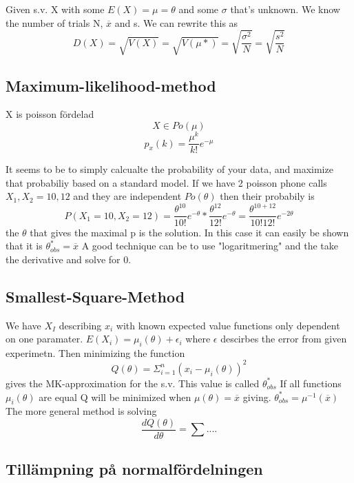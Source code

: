 \documentclass{article}
\begin{document}
        Given s.v. X with some $E(X) = \mu = \theta$ and some $\sigma$
        that's unknown. We know the number of trials N, $\overline{x}$ and s.
        We can rewrite this as
        \[
            D(X) = \sqrt{V(X)} = \sqrt{V(\mu*)} = \sqrt{\frac{\sigma^2}{N}}
            = \sqrt{\frac{s^2}{N}}
        \]
        
        
    \subsection{Maximum-likelihood-method}
        X is poisson fördelad
        \[
            X \in Po(\mu)    
        \]
        \[
            p_x(k) = \frac{\mu^k}{k!}e^{-\mu}
        \]
        
        It seems to be to simply calcualte the probability of your data, and 
        maximize that probabiliy based on a standard model. If we have 2 poisson
        phone calls $X_1, X_2= 10, 12$ and they are independent $Po(\theta)$
        then their probabily is 
        \[
            P(X_1 = 10, X_2 = 12) = \frac{\theta^{10}}{10!}e^{-\theta}*\frac{\theta^{12}}{12!}e^{-\theta} = \frac{\theta^{10+12}}{10!12!}e^{-2\theta}
        \]
        the $\theta$ that gives the maximal p is the solution. In this case it can easily
        be shown that it is $\theta_{obs}^* = \overline{x}$
        A good technique can be to use "logaritmering" and the take the derivative and solve for 0.
    \subsection{Smallest-Square-Method}
        We have $X_I$ describing $x_i$ with known expected value functions only dependent on 
        one paramater. $E(X_i) = \mu_i(\theta) + \epsilon_i$ where $\epsilon$
        descirbes the error from given experimetn. Then minimizing the function
        \begin{equation}
            Q(\theta) = \Sigma_{i=1}^{n} (x_i - \mu_i(\theta))^2
        \end{equation}
        gives the MK-approximation for the s.v. This value is called $\theta_{obs}^*$
        If all functions $\mu_i(\theta)$ are equal Q will be minimized when 
        $\mu(\theta) = \overline{x}$ giving. $\theta_{obs}^* = \mu^{-1}(\overline{x})$
        The more general method is solving
        \begin{equation}
            \frac{dQ(\theta)}{d\theta} = \sum....
        \end{equation}
    \subsection{Tillämpning på normalfördelningen}
\end{document}

